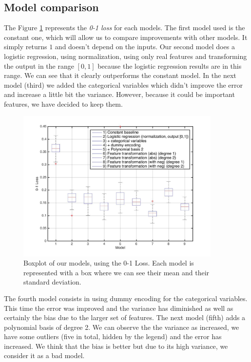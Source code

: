 \documentclass{article} %
\begin{document}
\subsection{Model comparison}

The Figure \ref{fig:models_classification} represents the \textit{0-1 loss} for each models. The first model used is the constant one, which will allow us to compare improvements with other models. It simply returns $1$ and doesn't depend on the inputs. Our second model does a logistic regression, using normalization, using only real features and transforming the output in the range $[0,1]$ because the logistic regression results are in this range. We can see that it clearly outperforms the constant model. In the next model (third) we added the categorical variables which didn't improve the error and increase a little bit the variance. However, because it could be important features, we have decided to keep them.

\begin{figure}
\center
\includegraphics[width=4in]{figures/models_classification.jpg} 
\vspace{-1em}
\caption{Boxplot of our models, using the 0-1 Loss. Each model is represented with a box where we can see their mean and their standard deviation.}
\label{fig:models_classification}
\vspace{-0.5em}
\end{figure}

The fourth model consists in using dummy encoding for the categorical variables. This time the error was improved and the variance has diminished as well as certainly the bias due to the larger set of features. The next model (fifth) adds a polynomial basis of degree 2. We can observe the the variance as increased, we have some outliers (five in total, hidden by the legend) and the error has increased. We think that the bias is better but due to its high variance, we consider it as a bad model.
\end{document}
